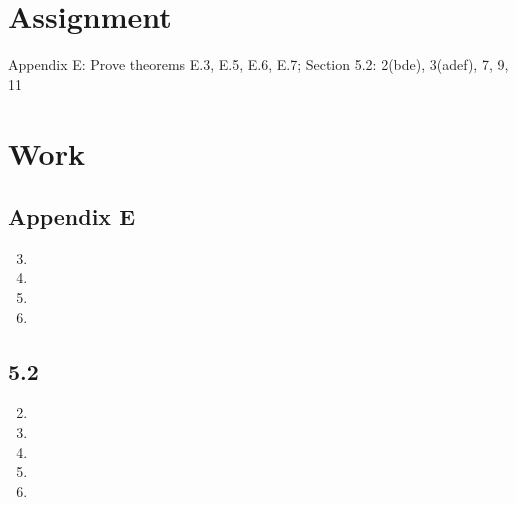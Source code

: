 \documentclass[letterpaper,12pt]{article}
\begin{document}
\section*{Assignment}
Appendix E: Prove theorems E.3, E.5, E.6, E.7; Section 5.2: 2(bde), 3(adef), 7, 9, 11
\section*{Work}
\subsection*{Appendix E}
\begin{enumerate}
\setcounter{enumi}{2}
\item

\setcounter{enumi}{4}
\item

\newpage{}
\item

\item

\end{enumerate}
\newpage{}
\subsection*{5.2}
\begin{enumerate}
\setcounter{enumi}{1}
\item

\item

\setcounter{enumi}{6}
\item

\setcounter{enumi}{8}
\item

\setcounter{enumi}{10}
\item

\end{enumerate}
\end{document}
